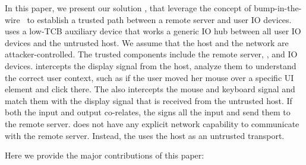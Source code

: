  In this paper, we present our solution \name, that leverage the concept of bump-in-the-wire~\cite{McCPerRei2006} to establish a trusted path between a remote server and user IO devices. \name uses a low-TCB auxiliary device that works a generic IO hub between all user IO devices and the untrusted host. 
We assume that the host and the network are attacker-controlled. The trusted components include the remote server, \device, and IO devices. \device intercepts the display signal from the host, analyze them to understand the correct user context, such as if the user moved her mouse over a specific UI element and click there. The \device also intercepts the mouse and keyboard signal and match them with the display signal that is received from the untrusted host. If both the input and output co-relates, the \device signs all the input and send them to the remote server. \device does not have any explicit network capability to communicate with the remote server. Instead, the \device uses the host as an untrusted transport.

 Here we provide the major contributions of this paper:
\begin{mylist}
  \item
\end{mylist}

